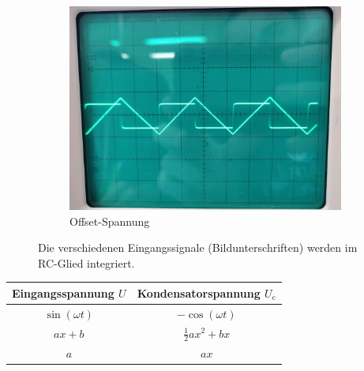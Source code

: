 \begin{figure}
        \quad
        \begin{subfigure}[b]{0.475\textwidth}   
            \centering 
            \includegraphics[width=\textwidth]{content/data/rechteck2.jpg}
            \caption[]%
            {{\small Offset-Spannung}}    
            \label{fig:mean and std of net44}
        \end{subfigure}
        \caption[]
        {\small Die verschiedenen Eingangssignale (Bildunterschriften) werden im RC-Glied integriert.} 
        \label{fig:integrabel}
    \end{figure}

    \begin{table}
        \centering
        \begin{tabular}{cc}
            \toprule
            Eingangsspannung $U$ & Kondensatorspannung $U_\text{c}$ \\
            \midrule
            $\sin(\omega t)$ & $-\cos(\omega t)$ \\
            $ax+b$ & $\frac{1}{2}ax^2+bx$ \\
            $a$ & $ax$ \\
            \bottomrule
        \end{tabular}
    \end{table}